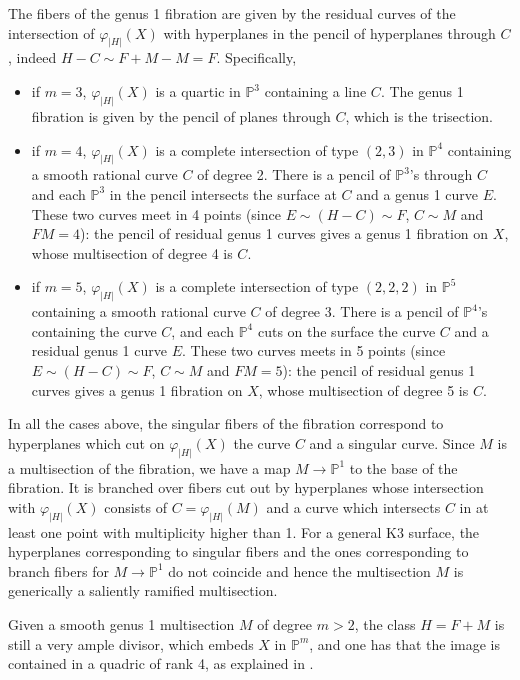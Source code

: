 \documentclass{amsart}
\theoremstyle{definition}
\numberwithin{equation}{section}
\newcommand{\ra}{\rightarrow}
\begin{document}
The fibers of the genus 1 fibration are given by the residual curves of the intersection of $\varphi_{|H|}(X)$ with hyperplanes in the pencil of hyperplanes through $C$, indeed $H-C\sim F+M-M=F$. Specifically,
\begin{itemize}
\item if $m=3$, $\varphi_{|H|}(X)$ is a quartic in $\mathbb{P}^3$ containing a line $C$. The genus 1 fibration is given by the pencil of planes through $C$, which is the trisection.
\item if $m=4$, $\varphi_{|H|}(X)$ is a complete intersection of type $(2,3)$ in $\mathbb{P}^4$ containing a smooth rational curve $C$ of degree 2. There is a pencil of $\mathbb{P}^3$'s through $C$ and each $\mathbb{P}^3$ in the pencil intersects the surface at $C$ and a genus 1 curve $E$. These two curves meet in 4 points (since $E\sim (H-C)\sim  F$, $C\sim M$ and $FM=4$): the pencil of residual genus 1 curves gives a genus 1 fibration on $X$, whose multisection of degree 4 is $C$.
\item if $m=5$, $\varphi_{|H|}(X)$ is a complete intersection of type $(2,2,2)$ in $\mathbb{P}^5$ containing a smooth rational curve $C$ of degree 3. There is a pencil of $\mathbb{P}^4$'s containing the curve $C$, and each $\mathbb{P}^4$ cuts on the surface the curve $C$ and a residual genus 1 curve $E$. These two curves meets in 5 points (since $E\sim (H-C)\sim F$, $C\sim M$ and $FM=5$): the pencil of residual genus 1 curves gives a genus 1 fibration on $X$, whose multisection of degree 5 is $C$.
\end{itemize}
In all the cases above, the singular fibers of the fibration correspond to hyperplanes which cut on $\varphi_{|H|}(X)$ the curve $C$ and a singular curve. Since $M$ is a multisection of the fibration, we have a map $M\ra \mathbb{P}^1$ to the base of the fibration. It is branched over fibers cut out by hyperplanes whose intersection with $\varphi_{|H|}(X)$ consists of $C=\varphi_{|H|}(M)$ and a curve which intersects $C$ in at least one point with multiplicity higher than 1. For a general K3 surface, the hyperplanes corresponding to singular fibers and the ones corresponding to branch fibers for $M\ra \mathbb{P}^1$ do not coincide and hence the multisection $M$ is generically a saliently ramified multisection.

Given a smooth genus 1 multisection $M$ of degree $m>2$, the class $H=F+M$ is still a very ample divisor, which embeds $X$ in $\mathbb{P}^m$, and one has that the image is contained in a quadric of rank 4, as explained in \cite[Paragraph 5.3]{vanGeemen}.\\
\end{document}
